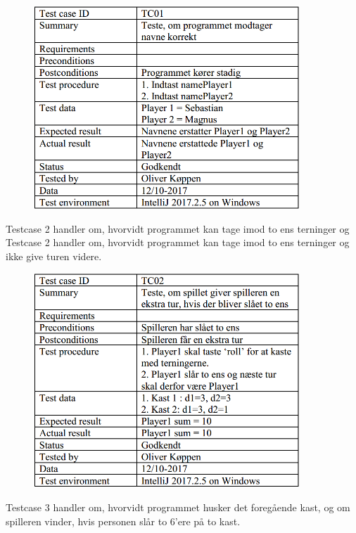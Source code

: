 \begin{figure}[h]
    \begin{center}
        \includegraphics[width=10cm]{graphics/TC01}
    \end{center}
\end{figure}

Testcase 2 handler om, hvorvidt programmet kan tage imod to ens terninger og Testcase 2 handler om, hvorvidt programmet kan tage imod to ens terninger og ikke give turen videre.

\begin{figure}[h]
    \begin{center}
        \includegraphics[width=10cm]{graphics/TC02}
    \end{center}
\end{figure}

Testcase 3 handler om, hvorvidt programmet husker det foregående kast, og om spilleren vinder, hvis personen slår to 6'ere på to kast.

